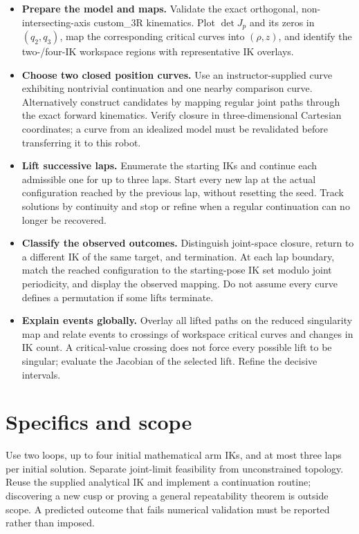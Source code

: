 \documentclass[11pt,a4paper]{article}
\begin{document}
\begin{itemize}
  \item \textbf{Prepare the model and maps.} Validate the exact orthogonal,
non-intersecting-axis custom\_3R kinematics. Plot $\det J_p$ and its zeros in
$(q_2,q_3)$, map the corresponding critical curves into $(\rho,z)$, and identify
the two-/four-IK workspace regions with representative IK overlays.

  \item \textbf{Choose two closed position curves.} Use an instructor-supplied
curve exhibiting nontrivial continuation and one nearby comparison curve.
Alternatively construct candidates by mapping regular joint paths through
the exact forward kinematics. Verify closure in three-dimensional Cartesian
coordinates; a curve from an idealized model must be revalidated before
transferring it to this robot.

  \item \textbf{Lift successive laps.} Enumerate the starting IKs and continue
each admissible one for up to three laps. Start every new lap at the actual
configuration reached by the previous lap, without resetting the seed.
Track solutions by continuity and stop or refine when a regular continuation
can no longer be recovered.

  \item \textbf{Classify the observed outcomes.} Distinguish joint-space closure,
return to a different IK of the same target, and termination. At each lap
boundary, match the reached configuration to the starting-pose IK set modulo
joint periodicity, and display the observed mapping. Do not assume every
curve defines a permutation if some lifts terminate.

  \item \textbf{Explain events globally.} Overlay all lifted paths on the reduced
singularity map and relate events to crossings of workspace critical curves
and changes in IK count. A critical-value crossing does not force every
possible lift to be singular; evaluate the Jacobian of the selected lift.
Refine the decisive intervals.
\end{itemize}

\newpage
\section*{Specifics and scope}
Use two loops, up to four initial mathematical arm IKs, and at most
three laps per initial solution. Separate joint-limit feasibility from
unconstrained topology. Reuse the supplied analytical IK and implement a continuation routine;
discovering a new cusp or proving a general repeatability theorem is outside
scope. A predicted outcome that fails numerical validation must be reported
rather than imposed.
\end{document}
